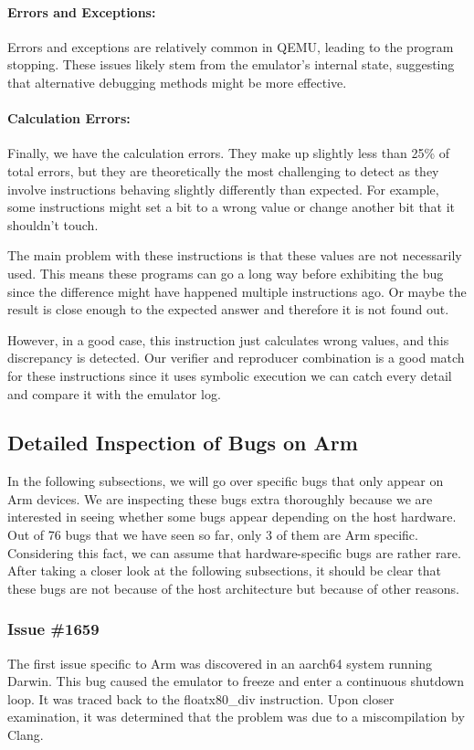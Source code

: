 \paragraph{Errors and Exceptions:}
Errors and exceptions are relatively common in \ac{QEMU}, leading to the program stopping. These issues likely stem from the emulator's internal state, suggesting that alternative debugging methods might be more effective.

\paragraph{Calculation Errors:}
Finally, we have the calculation errors.
They make up slightly less than 25\% of total errors, but they are theoretically the most challenging to detect as they involve instructions behaving slightly differently than expected.
For example, some instructions might set a bit to a wrong value or change another bit that it shouldn't touch.

The main problem with these instructions is that these values are not necessarily used.
This means these programs can go a long way before exhibiting the bug since the difference might have happened multiple instructions ago.
Or maybe the result is close enough to the expected answer and therefore it is not found out.

However, in a good case, this instruction just calculates wrong values, and this discrepancy is detected.
Our verifier and reproducer combination is a good match for these instructions since it uses symbolic execution we can catch every detail and compare it with the emulator log.

\subsection{Detailed Inspection of Bugs on Arm}
In the following subsections, we will go over specific bugs that only appear on Arm devices.
We are inspecting these bugs extra thoroughly because we are interested in seeing whether some bugs appear depending on the host hardware.
Out of 76 bugs that we have seen so far, only 3 of them are Arm specific.
Considering this fact, we can assume that hardware-specific bugs are rather rare.
After taking a closer look at the following subsections, it should be clear that these bugs are not because of the host architecture but because of other reasons.

\subsubsection{Issue \#1659}
The first issue specific to Arm was discovered in an aarch64 system running Darwin.
This bug caused the emulator to freeze and enter a continuous shutdown loop.
It was traced back to the floatx80\_div instruction.
Upon closer examination, it was determined that the problem was due to a miscompilation by Clang.

